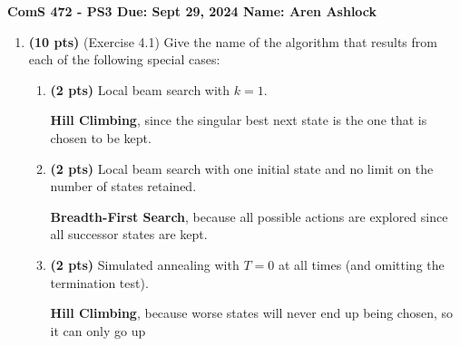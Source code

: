 \documentclass{article}
\begin{document}
\noindent\textbf{ComS 472 - PS3 \quad Due: Sept 29, 2024 \quad Name: Aren Ashlock}

\begin{enumerate}


\item \textbf{(10 pts)} (Exercise 4.1) Give the name of the algorithm that results from each of the following special cases:

    \begin{enumerate}[label=($\alph*$)]
    
    
    \item \textbf{(2 pts)} Local beam search with $k = 1$.

    \color{blue}
        \textbf{Hill Climbing}, since the singular best next state is the one that is chosen to be kept.
    \color{black}



    \item \textbf{(2 pts)} Local beam search with one initial state and no limit on the number of states retained.

    \color{blue}
        \textbf{Breadth-First Search}, because all possible actions are explored since all successor states are kept.
    \color{black}



    \item \textbf{(2 pts)} Simulated annealing with $T = 0$ at all times (and omitting the termination test).

    \color{blue}
       \textbf{Hill Climbing}, because worse states will never end up being chosen, so it can only go up
    \color{black}




\end{enumerate}
\end{enumerate}
\end{document}
